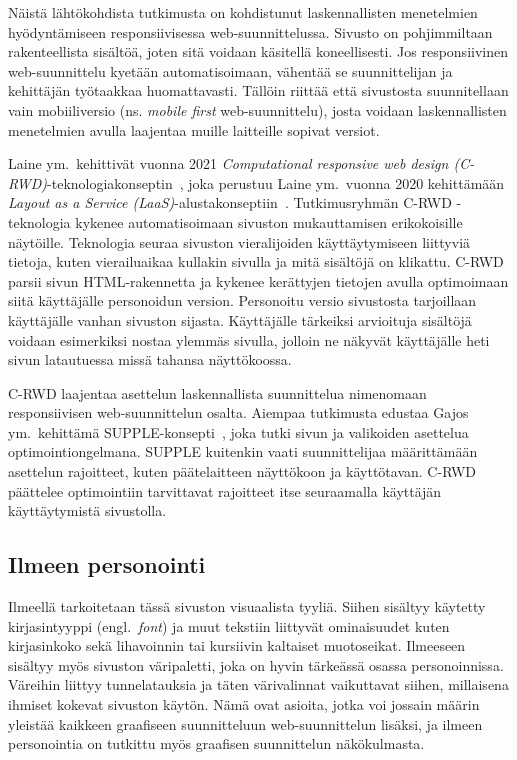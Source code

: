 \documentclass[finnish, 12pt, a4paper, elec, utf8, a-1b, online]{aaltothesis}
\begin{document}
Näistä lähtökohdista tutkimusta on kohdistunut laskennallisten menetelmien
hyödyntämiseen responsiivisessa web-suunnittelussa. Sivusto on pohjimmiltaan
rakenteellista sisältöä, joten sitä voidaan käsitellä koneellisesti. Jos
responsiivinen web-suunnittelu kyetään automatisoimaan, vähentää se
suunnittelijan ja kehittäjän työtaakkaa huomattavasti. Tällöin riittää että
sivustosta suunnitellaan vain mobiiliversio (ns. \textit{mobile first}
web-suunnittelu), josta voidaan laskennallisten menetelmien avulla laajentaa
muille laitteille sopivat versiot.

Laine ym.~kehittivät vuonna 2021 \textit{Computational responsive web design
    (C-RWD)}-teknologiakonseptin~\cite{laine2021responsive}, joka perustuu Laine
    ym.~vuonna 2020 kehittämään \textit{Layout as a Service
    (LaaS)}-alustakonseptiin~\cite{laine2020_laas}. Tutkimusryhmän C-RWD
    -teknologia kykenee automatisoimaan sivuston mukauttamisen erikokoisille
    näytöille. Teknologia seuraa sivuston vieralijoiden käyttäytymiseen
    liittyviä tietoja, kuten vierailuaikaa kullakin sivulla ja mitä sisältöjä on
    klikattu. C-RWD parsii sivun HTML-rakennetta ja kykenee kerättyjen tietojen
    avulla optimoimaan siitä käyttäjälle personoidun version. Personoitu versio
    sivustosta tarjoillaan käyttäjälle vanhan sivuston sijasta. Käyttäjälle
    tärkeiksi arvioituja sisältöjä voidaan esimerkiksi nostaa ylemmäs sivulla,
    jolloin ne näkyvät käyttäjälle heti sivun latautuessa missä tahansa
    näyttökoossa.

C-RWD laajentaa asettelun laskennallista suunnittelua nimenomaan responsiivisen
web-suunnittelun osalta. Aiempaa tutkimusta edustaa Gajos ym.~kehittämä
SUPPLE-konsepti~\cite{10.1145/964442.964461}, joka tutki sivun ja valikoiden
asettelua optimointiongelmana. SUPPLE kuitenkin vaati suunnittelijaa
määrittämään asettelun rajoitteet, kuten päätelaitteen näyttökoon ja
käyttötavan. C-RWD päättelee optimointiin tarvittavat rajoitteet itse
seuraamalla käyttäjän käyttäytymistä sivustolla.

\subsection{Ilmeen personointi}

Ilmeellä tarkoitetaan tässä sivuston visuaalista tyyliä. Siihen sisältyy
käytetty kirjasintyyppi (engl.~\textit{font}) ja muut tekstiin liittyvät
ominaisuudet kuten kirjasinkoko sekä lihavoinnin tai kursiivin kaltaiset
muotoseikat. Ilmeeseen sisältyy myös sivuston väripaletti, joka on hyvin
tärkeässä osassa personoinnissa. Väreihin liittyy tunnelatauksia ja täten
värivalinnat vaikuttavat siihen, millaisena ihmiset kokevat sivuston käytön.
Nämä ovat asioita, jotka voi jossain määrin yleistää kaikkeen graafiseen
suunnitteluun web-suunnittelun lisäksi, ja ilmeen personointia on tutkittu myös
graafisen suunnittelun näkökulmasta.
\end{document}
